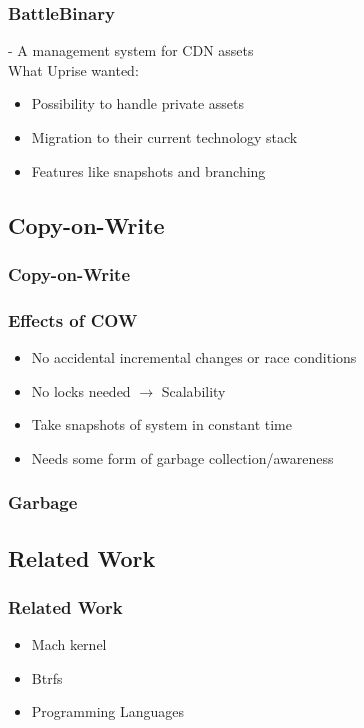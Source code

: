 \documentclass{beamer}
\begin{document}
\begin{frame}
  \frametitle{BattleBinary}
  - A management system for CDN assets\\
  \vspace{1em}
  What Uprise wanted:
  \begin{itemize}
    \item{Possibility to handle private assets}
    \item{Migration to their current technology stack}
    \item{Features like snapshots and branching}
  \end{itemize}
\end{frame}

\subsection{Copy-on-Write}
\begin{frame}
  \frametitle{Copy-on-Write}
  \centerline{}
\end{frame}

\begin{frame}
  \frametitle{Effects of COW}
  \begin{itemize}
    \item{No accidental incremental changes or race conditions}
    \pause
    \item{No locks needed $\rightarrow$ Scalability}
    \pause
    \item{Take snapshots of system in constant time}
    \pause
    \item{Needs some form of garbage collection/awareness}
   \end{itemize}
\end{frame}

\begin{frame}
  \frametitle{Garbage}
  \centerline{}
\end{frame}


\subsection{Related Work}
\begin{frame}
  \frametitle{Related Work}
  \begin{itemize}
    \item{Mach kernel}
    \pause
    \item{Btrfs}
    \pause
    \item{Programming Languages}
  \end{itemize}
\end{frame}
\end{document}
